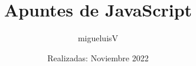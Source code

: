 \documentclass[12pt]{article}
\title{Apuntes de JavaScript}
\author{migueluisV}
\date{Realizadas: Noviembre 2022}
\begin{document}
\renewcommand*\contentsname{Índice}
\renewcommand{\listtablename}{Índice de Tablas}
\renewcommand{\listfigurename}{Índice de Figuras}

\maketitle\newpage
\tableofcontents\newpage
\listoffigures\newpage
\listoftables\newpage








\end{document}

